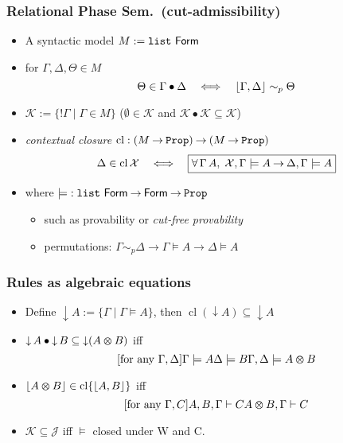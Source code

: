 \documentclass[xcolor=pdftex,graphicx=pdftex,12pt]{beamer}
\renewcommand\frule[1]{\ensuremath{\langle#1\rangle}}
\newcommand{\coq}[1]{\ensuremath{\mathalpha{\mathtt{#1}}}}
\newcommand{\cfun}{\mathbin{\rightarrow}}
\newcommand{\Prop}{\coq{Prop}}
\newcommand{\cdef}{\mathrel{\mathtt{:=}}}
\renewcommand{\iff}{\mathrel\Longleftrightarrow}
\newcommand{\seq}{\mathrel\vdash}
\newcommand{\ltime}{\mathbin{\varotimes}}
\newcommand{\lbang}{\mathop{!}}
\newcommand{\cperm}{\mathrel{\sim_p}}
\newcommand{\cl}{\mathop{\mathrm{cl}}}
\newcommand{\mmult}{\mathbin{\bullet}}
\newcommand{\set}[1]{\mathcal{#1}}
\newcommand{\pable}{\mathrel{\models}}
\begin{document}
\begin{frame}

\frametitle{Relational Phase Sem.\ (cut-admissibility)}


\begin{itemize}
\item A syntactic model  $M\cdef \coq{list}~\mathsf{Form}$
\item for $\Gamma,\Delta,\Theta\in M$
$$\Theta\in \Gamma\mmult \Delta \quad\iff\quad\ulist{\Gamma,\Delta}\cperm\Theta$$
\item $\set K\cdef \{\lbang\Gamma\mid\Gamma\in M\}$ ($\emptyset\in\set K$ and $\set K\mmult\set K\subseteq\set K$)
\item \emph{contextual closure}  $\cl: (M\cfun\Prop)\cfun (M\cfun\Prop)$ 
$$\Delta\in\cl\set X\quad\iff\quad \fbox{$\forall\,\Gamma\,A,\;\set X,\Gamma\pable A\cfun \Delta,\Gamma\pable A$}$$ 
\item where ${\pable}:\coq{list}~\mathsf{Form}\cfun\mathsf{Form}\cfun\Prop$
  \begin{itemize}
  \item such as provability or \emph{cut-free provability}
  \item permutations: $\Gamma\cperm\Delta\cfun \Gamma\pable A\cfun \Delta\pable A$
  \end{itemize}
\end{itemize}

\end{frame}

\newcommand{\dc}{\mathop{\downarrow}}
\renewcommand\frule[1]{#1}


\begin{frame}

\frametitle{Rules as algebraic equations}

\begin{itemize}

\item Define $\dc A\cdef \{\Gamma\mid \Gamma\pable A\}$, then $\cl(\dc A)\subseteq \dc A$ 
\item $\dc A\mmult\dc B\subseteq \dc(A\ltime B)$ iff 
$$
\infer2[\text{for any $\Gamma,\Delta$}]   {\Gamma \pable A}{\Delta \pable B}
                      {\Gamma, \Delta \pable A \ltime B}$$
\item $\ulist{A\ltime B}\in\cl\{\ulist{A,B}\}$ iff
$$
\infer1[\text{for any $\Gamma,C$}]   {A,B,\Gamma \seq C} 
                      { A \ltime B, \Gamma\seq C}$$
\item $\set K\subseteq\set J$ iff $\pable$ closed under \frule W and \frule C.
\end{itemize}

\end{frame}
\end{document}
